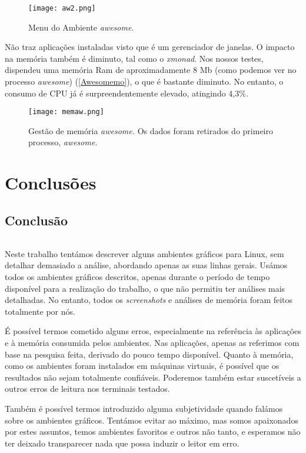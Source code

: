 \documentclass[11pt,openright,twoside]{report}
\begin{document}
\begin{figure}
 \center
 \texttt{[image: aw2.png]}
 \caption{Menu do Ambiente \textit{awesome}.}
 \label{Awesomem}
\end{figure}

Não traz aplicações instaladas visto que é um gerenciador de janelas. O impacto na memória também é diminuto, tal como o\textit{ xmonad}. Nos nossos testes, dispendeu uma memória Ram de aproximadamente 8 Mb (como podemos ver no processo \textit{awesome}) (\autoref{Awesomemo}), o que é bastante diminuto. No entanto, o consumo de CPU já é surpreendentemente elevado, atingindo 4,3\%.

\begin{figure}
 \center
 \texttt{[image: memaw.png]}
 \caption{Gestão de memória \textit{awesome. } Os dados foram retirados do primeiro processo, \textit{awesome.}}
 \label{Awesomemo}
\end{figure}

\part{Conclusões}

\chapter{Conclusão}
\paragraph{  }Neste trabalho tentámos descrever alguns ambientes gráficos para Linux, sem detalhar demasiado a análise, abordando apenas as suas linhas gerais. Usámos todos os ambientes gráficos descritos, apenas durante o período de tempo disponível para a realização do trabalho, o que não permitiu ter análises mais detalhadas. No entanto, todos os \textit{screenshots} e análises de memória foram feitos totalmente por nós.

É possível termos cometido alguns erros, especialmente na referência às aplicações e à memória consumida pelos ambientes. Nas aplicações, apenas as referimos com base na pesquisa feita, derivado do pouco tempo disponível. Quanto à memória, como os ambientes foram instalados em máquinas virtuais, é possível que os resultados não sejam totalmente confiáveis. Poderemos também estar suscetíveis a outros erros de leitura nos terminais testados.

Também é possível termos introduzido alguma subjetividade quando falámos sobre os ambientes gráficos. Tentámos evitar ao máximo, mas somos apaixonados por estes assuntos, temos ambientes favoritos e outros não tanto, e esperamos não ter deixado transparecer nada que possa induzir o leitor em erro.




\end{document}
